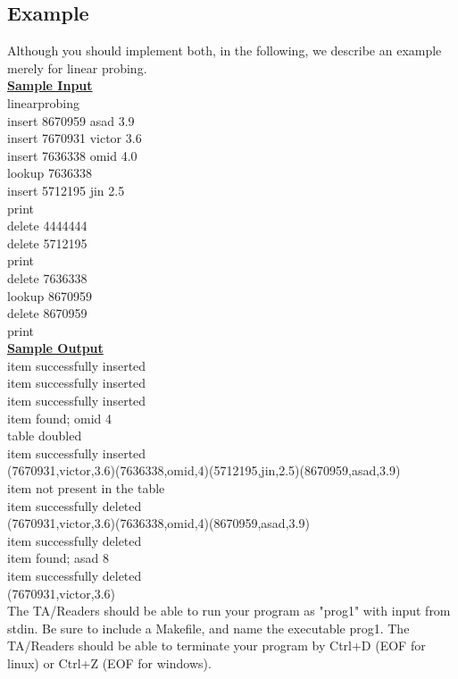 \documentclass[times, 12pt]{article}
\begin{document}
\subsection*{Example}
Although you should implement both, in the following, we describe an example merely for linear probing.\\
\underline{\textbf{Sample Input}}\\
linearprobing\\
insert 8670959 asad 3.9\\
insert 7670931 victor 3.6\\
insert 7636338 omid 4.0\\
lookup 7636338\\
insert 5712195 jin 2.5\\
print\\
delete 4444444\\
delete 5712195\\
print\\
delete 7636338\\
lookup 8670959\\
delete 8670959\\
print\\

\noindent\underline{\textbf{Sample Output}}\\
item successfully inserted\\
item successfully inserted\\
item successfully inserted\\
item found; omid 4\\
table doubled\\
item successfully inserted\\
(7670931,victor,3.6)(7636338,omid,4)(5712195,jin,2.5)(8670959,asad,3.9)\\
item not present in the table\\
item successfully deleted\\
(7670931,victor,3.6)(7636338,omid,4)(8670959,asad,3.9)\\
item successfully deleted\\
item found; asad 8\\
item successfully deleted\\
(7670931,victor,3.6)\\

The TA/Readers should be able to run your program as "prog1" with input from stdin. Be sure to include a Makefile, and name the executable prog1. The TA/Readers should be able to terminate your program by Ctrl+D (EOF for linux) or Ctrl+Z (EOF for windows).\\
\end{document}
